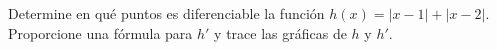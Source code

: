 \item Determine en qué puntos es diferenciable la función $h(x) = |x - 1| + |x - 2|$. Proporcione una fórmula para $h'$ y trace las gráficas de $h$ y $h'$.
